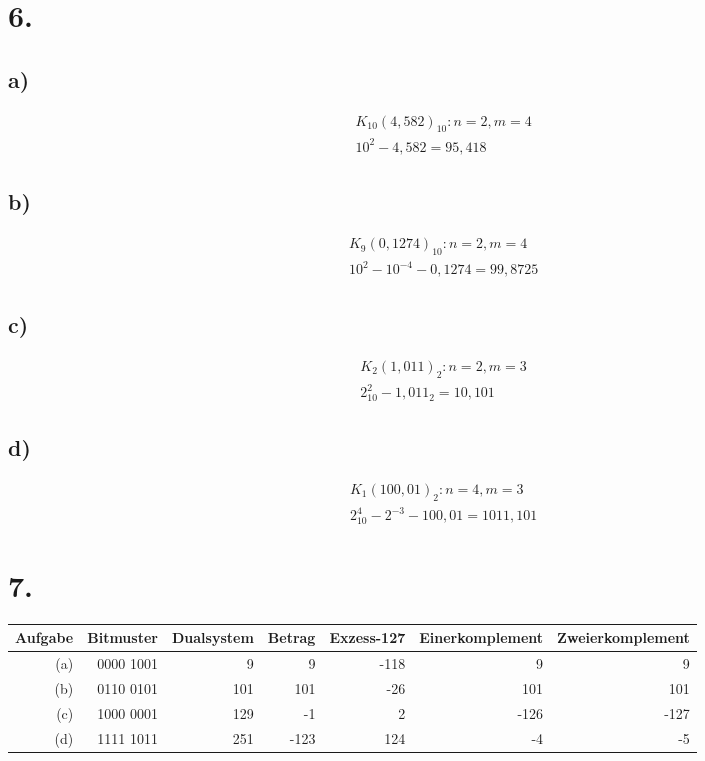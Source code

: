 \documentclass[a4paper]{scrartcl}
\begin{document}
	
\section{6.}
	\subsection{a)}
	\[	
	\begin{array}{ll}
		&K_{10}(4,582)_{10}: n=2, m=4 \\
		&10^2 -4,582 = 95,418
	\end{array}
	\]
			
	\subsection{b)}
	\[
	\begin{array}{ll}
		&K_{9}(0,1274)_{10}: n=2, m=4 \\
		&10^2-10^{-4}-0,1274=99,8725
	\end{array}
	\]
	
	\subsection{c)}
	\[
	\begin{array}{ll}
		& K_2(1,011)_2: n=2,m=3 \\
		& 2^2_{10}-1,011_2=10,101
	\end{array}
	\]
	
	\subsection{d)}
	\[
	\begin{array}{ll}
		&K_1(100,01)_2: n=4,m=3 \\
		&2^4_{10}-2^{-3}-100,01=1011,101
	\end{array}
	\]


\section{7.}
	\begin{tabular}{|r|r||r|r|r|r|r|}
		\hline
		Aufgabe & Bitmuster & Dualsystem & Betrag & Exzess-127 & Einerkomplement & Zweierkomplement 
			\\ \hline\hline
		(a) &0000 1001 &   9 &    9 & -118 &    9 &    9 \\ \hline
		(b) &0110 0101 & 101 &  101 &  -26 &  101 &  101 \\ \hline
		(c) &1000 0001 & 129 &   -1 &    2 & -126 & -127 \\ \hline
		(d) &1111 1011 & 251 & -123 &  124 &   -4 &   -5 \\ \hline
	\end{tabular}
\end{document}
